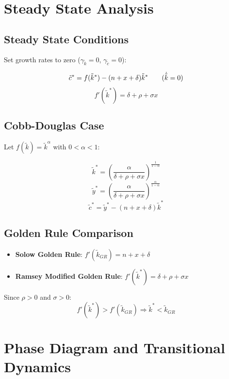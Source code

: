 \documentclass[a4paper,11pt]{article}
\newcommand{\ktilde}{\tilde{k}}
\newcommand{\ytilde}{\tilde{y}}
\newcommand{\ctilde}{\tilde{c}}
\begin{document}
\clearpage

\section*{Steady State Analysis}

\subsection*{Steady State Conditions}
Set growth rates to zero ($\gamma_{\ktilde} = 0$, $\gamma_{\ctilde} = 0$):

\begin{resultbox}
\[
\ctilde^* = f(\ktilde^*) - (n + x + \delta)\ktilde^* 
\tag{$\dot{\ktilde} = 0$}
\]
\[
f'(\ktilde^*) = \delta + \rho + \sigma x
\tag{Modified Golden Rule}
\]
\end{resultbox}

\subsection*{Cobb-Douglas Case}
Let $f(\ktilde) = \ktilde^\alpha$ with $0 < \alpha < 1$:

\begin{resultbox}
\[
\ktilde^* = \left( \frac{\alpha}{\delta + \rho + \sigma x} \right)^{\frac{1}{1-\alpha}}
\]
\[
\ytilde^* = \left( \frac{\alpha}{\delta + \rho + \sigma x} \right)^{\frac{\alpha}{1-\alpha}}
\]
\[
\ctilde^* = \ytilde^* - (n + x + \delta)\ktilde^*
\]
\end{resultbox}

\subsection*{Golden Rule Comparison}
\begin{itemize}
    \item \textbf{Solow Golden Rule}: $f'(\ktilde_{GR}) = n + x + \delta$
    \item \textbf{Ramsey Modified Golden Rule}: $f'(\ktilde^*) = \delta + \rho + \sigma x$
\end{itemize}

Since $\rho > 0$ and $\sigma > 0$:
\[
f'(\ktilde^*) > f'(\ktilde_{GR}) \Rightarrow \ktilde^* < \ktilde_{GR}
\]

\clearpage

\section*{Phase Diagram and Transitional Dynamics}
\end{document}
